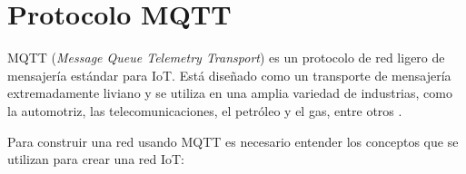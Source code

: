 




\section{Protocolo MQTT}

MQTT  (\textit{Message Queue Telemetry Transport}) es un protocolo de red ligero de mensajería estándar para IoT. Está diseñado como un transporte de mensajería extremadamente liviano y se utiliza en una amplia variedad de industrias, como la automotriz, las telecomunicaciones, el petróleo y el gas, entre otros  \citep{WEBSITE:4}. 

Para construir una red usando MQTT es necesario entender los conceptos que se utilizan para crear una red IoT: 

